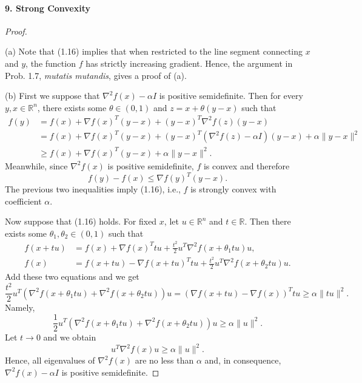   \paragraph{9. Strong Convexity}
  \begin{proof}
    $\,$\par
    (a) Note that (1.16) implies that when restricted to the line segment
    connecting $x$ and $y$, the function $f$ has strictly increasing gradient.
    Hence, the argument in Prob. 1.7, \textit{mutatis mutandis}, gives a proof 
    of (a).\par
    (b) First we suppose that $\nabla^2f(x)-\alpha I$ is positive semidefinite.
    Then for every $y,x\in\mathbb{R}^n$, there exists some $\theta\in(0,1)$ and 
    $z=x+\theta(y-x)$ such that
    \begin{equation}
      \label{eq:1.9.1}
    \begin{split}
      f(y)
      &=f(x)+\nabla f(x)^T(y-x)+(y-x)^T\nabla^2f(z)(y-x)\\
      &=f(x)+\nabla f(x)^T(y-x)+(y-x)^T(\nabla^2f(z)-\alpha I)(y-x)
        +\alpha\|y-x\|^2\\
      &\ge f(x)+\nabla f(x)^T(y-x)+\alpha\|y-x\|^2.
    \end{split}
    \end{equation}
    Meanwhile, since $\nabla^2f(x)$ is positive semidefinite, $f$ is convex and
    therefore
    \begin{equation}
      \label{eq:1.9.2}
      f(y)-f(x)\le \nabla f(y)^T(y-x).
    \end{equation}
    The previous two inequalities imply (1.16), i.e., $f$ is strongly convex 
    with coefficient $\alpha$.\par
    Now suppose that (1.16) holds. For fixed $x$, let $u\in\mathbb{R}^n$ and 
    $t\in\mathbb{R}$. Then there exists some $\theta_1,\theta_2\in(0,1)$ such
    that
    \begin{align*}
      f(x+tu)&=f(x)+\nabla f(x)^Ttu+\frac{t^2}{2}u^T\nabla^2f(x+\theta_1tu)u,\\
      f(x)&=f(x+tu)-\nabla f(x+tu)^Ttu+\frac{t^2}{2}u^T\nabla^2
            f(x+\theta_2tu)u.
    \end{align*}
    Add these two equations and we get
    \[
      \frac{t^2}{2}u^T(\nabla^2f(x+\theta_1tu)+\nabla^2f(x+\theta_2tu))u
      =(\nabla f(x+tu)-\nabla f(x))^Ttu \ge \alpha\|tu\|^2.
    \]
    Namely,
    \[
      \frac{1}{2}u^T(\nabla^2f(x+\theta_1tu)+\nabla^2f(x+\theta_2tu))u\ge 
      \alpha\|u\|^2.
    \]
    Let $t\to 0$ and we obtain
    \[
      u^T\nabla^2f(x)u\ge \alpha\|u\|^2.
    \]
    Hence, all eigenvalues of $\nabla^2f(x)$ are no less than $\alpha$ and, in
    consequence, $\nabla^2f(x)-\alpha I$ is positive semidefinite.
  \end{proof}
  
